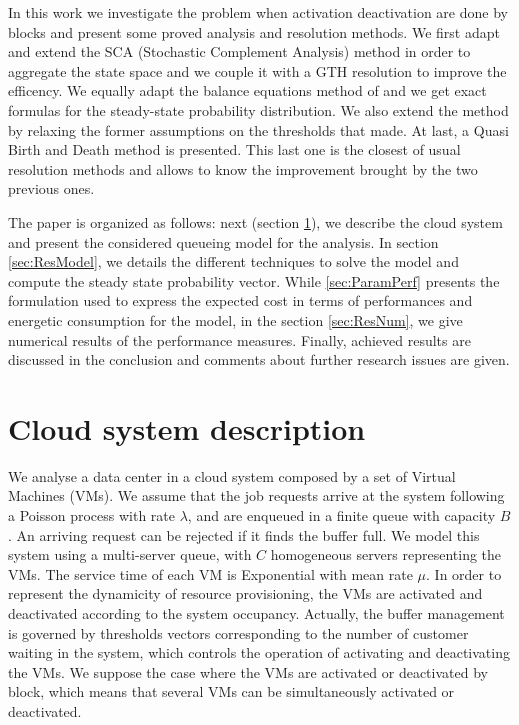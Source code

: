 \documentclass[conference]{IEEEtran}
\begin{document}
In this work we investigate the problem when activation deactivation are done by blocks and present some proved analysis and resolution methods.
We first adapt and extend the SCA (Stochastic Complement Analysis) method in order to aggregate
the state space and we couple it with a GTH resolution to improve the efficency.
We equally adapt the balance equations method of \cite{le2000simple} and we get exact formulas for the steady-state probability distribution. 
We also extend the method by relaxing the former assumptions on the thresholds that \cite{le2000simple} made.
At last, a Quasi Birth and Death method is presented. This last one is the closest of usual resolution methods 
and allows to know the improvement brought by the two previous ones.
 

The paper is organized as follows: next (section \ref{sec:ModelDet}), we describe the cloud system and present the considered queueing model 
for the analysis.
In section \ref{sec:ResModel}, we details the different techniques to solve the model and compute the steady state probability vector.
While \ref{sec:ParamPerf} presents the formulation used to express the expected cost
in terms of performances and energetic consumption for the model, 
in the section \ref{sec:ResNum}, we give numerical results of the performance measures. 
Finally, achieved results are discussed in the conclusion and comments about further research issues  are given.


\section{Cloud system description} \label{sec:ModelDet}

We analyse  a data center in a cloud system composed by a set of Virtual Machines (VMs). We assume that the job requests arrive at the system 
following a Poisson process with rate $\lambda$, and are enqueued in a finite queue with capacity $B$. An arriving request can be rejected if 
it finds the buffer full. 
We model this system  using a multi-server queue,  with $C$ homogeneous servers representing the VMs. The service time of each VM  is Exponential 
with mean rate $\mu$. In order to represent the dynamicity of resource provisioning, the VMs are activated and deactivated according to the system 
occupancy. Actually, the buffer management is governed by thresholds vectors corresponding to the number of customer waiting in the system, which 
controls the operation of activating and deactivating the VMs. We suppose the case where the VMs are activated or deactivated by block, which means 
that several VMs can be simultaneously activated or deactivated.  
\end{document}
